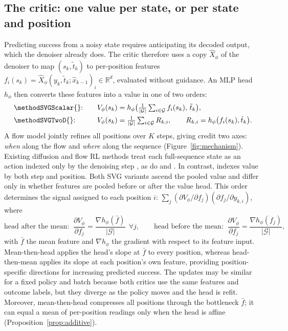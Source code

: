 \subsection{The critic: one value per state, or per state and position}
\label{sec:critic}\label{sec:jpc_scalar}\label{sec:jpc_2d}
Predicting success from a noisy state requires anticipating its decoded output, which the denoiser already does. The critic therefore uses a copy $\hat X_\phi$ of the denoiser to map $(s_k,\tilde t_k)$ to per-position features $f_i(s_k)=\hat X_\phi(y_k,\tilde t_k;\hat x_{k-1})_i\in\mathbb R^d$, evaluated without guidance. An MLP head $h_\phi$ then converts these features into a value in one of two orders:
\begin{alignat}{2}
&\text{\methodSVGScalar{}:}&\quad V_\phi(s_k)&=h_\phi\big(\tfrac1{|\mathcal G|}\textstyle\sum_{i\in\mathcal G}f_i(s_k),\,\tilde t_k\big),
\label{eq:critic1d}\\
&\text{\methodSVGTwoD{}:}&\quad V_\phi(s_k)&=\tfrac1{|\mathcal G|}\textstyle\sum_{i\in\mathcal G}R_{k,i}, \qquad R_{k,i}=h_\phi\big(f_i(s_k),\tilde t_k\big).
\label{eq:critic2d}
\end{alignat}
A flow model jointly refines all positions over \(K\) steps, giving credit two axes: \emph{when} along the flow and \emph{where} along the sequence (Figure~\ref{fig:mechanism}). Existing diffusion and flow RL methods treat each full-sequence state as an action indexed only by the denoising step \citep{liu2025flowgrpo,xue2025dancegrpo}, as do \methodGRPO{} and \methodSVGScalar{}. In contrast, \methodSVGTwoD{} indexes value by both step and position. Both SVG variants ascend the pooled value and differ only in whether features are pooled before or after the value head. This order determines the signal assigned to each position $i$: $\sum_{j}(\partial V_\phi/\partial f_j)(\partial f_j/\partial y_{k,i})$, where
\begin{equation}
\text{head after the mean: }\ \frac{\partial V_\phi}{\partial f_j}=\frac{\nabla h_\phi(\bar f)}{|\mathcal G|}\ \ \forall j,\qquad \text{head before the mean: }\ \frac{\partial V_\phi}{\partial f_j}=\frac{\nabla h_\phi(f_j)}{|\mathcal G|},
\label{eq:headgrad}
\end{equation}
with $\bar f$ the mean feature and $\nabla h_\phi$ the gradient with respect to its feature input. Mean-then-head applies the head's slope at $\bar f$ to every position, whereas head-then-mean applies its slope at each position's own feature, providing position-specific directions for increasing predicted success. The updates may be similar for a fixed policy and batch because both critics use the same features and outcome labels, but they diverge as the policy moves and the head is refit. Moreover, mean-then-head compresses all positions through the bottleneck $\bar f$; it can equal a mean of per-position readings only when the head is affine (Proposition~\ref{prop:additive}).


